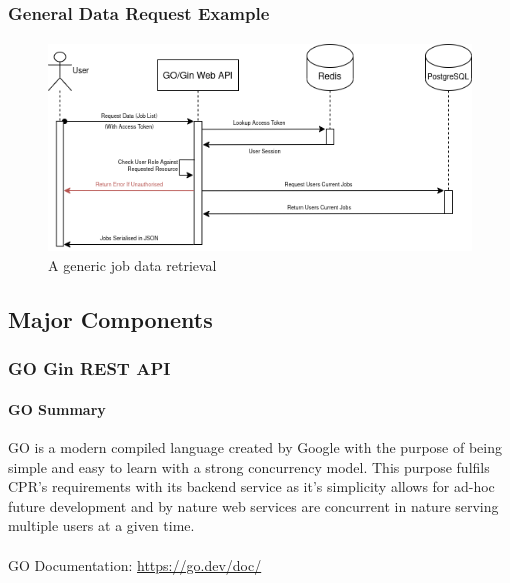 \pagebreak

\subsubsection{General Data Request Example}
\paragraph{}

\begin{figure}[h!]
    \includegraphics[width=\textwidth]{res/general-api-request}
    \caption{A generic job data retrieval}
    \label{fig:general-api-req}
\end{figure}

\pagebreak
\subsection{Major Components}\label{subsec:major-components}
\subsubsection{GO Gin REST API}

\paragraph{GO Summary}
GO is a modern compiled language created by Google with the purpose of being simple and easy to learn with a strong concurrency model.
This purpose fulfils CPR's requirements with its backend service as it's simplicity allows for ad-hoc future development and by nature web services
are concurrent in nature serving multiple users at a given time.

\paragraph{} GO Documentation: \url{https://go.dev/doc/}

